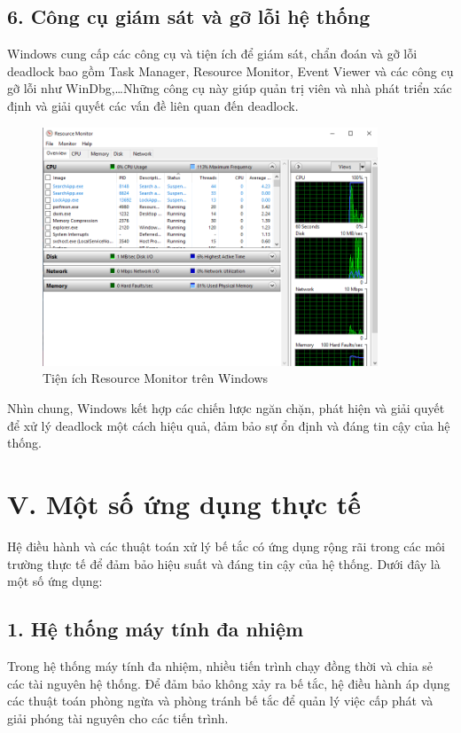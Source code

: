 \documentclass[12pt]{report}
\begin{document}
\subsection*{6. Công cụ giám sát và gỡ lỗi hệ thống}
Windows cung cấp các công cụ và tiện ích để giám sát, chẩn đoán và gỡ lỗi deadlock bao gồm Task Manager, Resource Monitor, Event Viewer và các công cụ gỡ lỗi như WinDbg,\ldots Những công cụ này giúp quản trị viên và nhà phát triển xác định và giải quyết các vấn đề liên quan đến deadlock.
\begin{figure}[ht]
	\centering
	\includegraphics[width=10cm]{resources/resource_monitor.png}
	\caption{Tiện ích Resource Monitor trên Windows}
\end{figure}

\vspace{2mm}
Nhìn chung, Windows kết hợp các chiến lược ngăn chặn, phát hiện và giải quyết để xử lý deadlock một cách hiệu quả, đảm bảo sự ổn định và đáng tin cậy của hệ thống.

\section*{V. Một số ứng dụng thực tế}

Hệ điều hành và các thuật toán xử lý bế tắc có ứng dụng rộng rãi trong các môi trường thực tế để đảm bảo hiệu suất và đáng tin cậy của hệ thống. Dưới đây là một số ứng dụng:

\subsection*{1. Hệ thống máy tính đa nhiệm}
Trong hệ thống máy tính đa nhiệm, nhiều tiến trình chạy đồng thời và chia sẻ các tài nguyên hệ thống. Để đảm bảo không xảy ra bế tắc, hệ điều hành áp dụng các thuật toán phòng ngừa và phòng tránh bế tắc để quản lý việc cấp phát và giải phóng tài nguyên cho các tiến trình.
\end{document}

